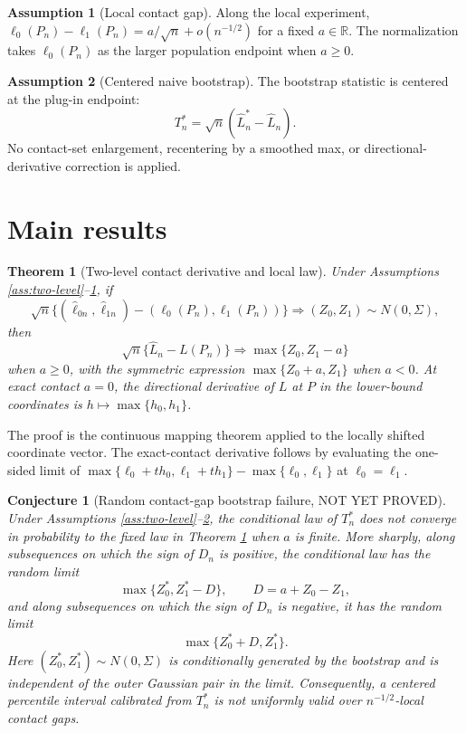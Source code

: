 \documentclass[11pt]{article}
\newcommand{\R}{\mathbb{R}}
\theoremstyle{definition}
\newtheorem{assumption}{Assumption}
\theoremstyle{plain}
\newtheorem{theorem}{Theorem}
\newtheorem{conjecture}{Conjecture}
\theoremstyle{remark}
\begin{document}
\begin{assumption}[Local contact gap]\label{ass:local-gap}
Along the local experiment, \(\ell_0(P_n)-\ell_1(P_n)=a/\sqrt n+o(n^{-1/2})\) for a fixed \(a\in\R\). The normalization takes \(\ell_0(P_n)\) as the larger population endpoint when \(a\ge 0\).
\end{assumption}

\begin{assumption}[Centered naive bootstrap]\label{ass:naive-bootstrap}
The bootstrap statistic is centered at the plug-in endpoint:
\[
T_n^\ast=\sqrt n(\widehat L_n^\ast-\widehat L_n).
\]
No contact-set enlargement, recentering by a smoothed max, or directional-derivative correction is applied.
\end{assumption}

\section{Main results}
\begin{theorem}[Two-level contact derivative and local law]\label{thm:contact-derivative}
Under Assumptions \ref{ass:two-level}--\ref{ass:local-gap}, if
\[
\sqrt n\{(\widehat\ell_{0n},\widehat\ell_{1n})-(\ell_0(P_n),\ell_1(P_n))\}\Rightarrow (Z_0,Z_1)\sim N(0,\Sigma),
\]
then
\[
\sqrt n\{\widehat L_n-L(P_n)\}\Rightarrow \max\{Z_0,Z_1-a\}
\]
when \(a\ge 0\), with the symmetric expression \(\max\{Z_0+a,Z_1\}\) when \(a<0\). At exact contact \(a=0\), the directional derivative of \(L\) at \(P\) in the lower-bound coordinates is \(h\mapsto\max\{h_0,h_1\}\).
\end{theorem}

The proof is the continuous mapping theorem applied to the locally shifted coordinate vector. The exact-contact derivative follows by evaluating the one-sided limit of \(\max\{\ell_0+th_0,\ell_1+th_1\}-\max\{\ell_0,\ell_1\}\) at \(\ell_0=\ell_1\).

\begin{conjecture}[Random contact-gap bootstrap failure, NOT YET PROVED]\label{conj:bootstrap-failure}
Under Assumptions \ref{ass:two-level}--\ref{ass:naive-bootstrap}, the conditional law of \(T_n^\ast\) does not converge in probability to the fixed law in Theorem \ref{thm:contact-derivative} when \(a\) is finite. More sharply, along subsequences on which the sign of \(D_n\) is positive, the conditional law has the random limit
\[
\max\{Z_0^\ast,Z_1^\ast-D\},\qquad D=a+Z_0-Z_1,
\]
and along subsequences on which the sign of \(D_n\) is negative, it has the random limit
\[
\max\{Z_0^\ast+D,Z_1^\ast\}.
\]
Here \((Z_0^\ast,Z_1^\ast)\sim N(0,\Sigma)\) is conditionally generated by the bootstrap and is independent of the outer Gaussian pair in the limit. Consequently, a centered percentile interval calibrated from \(T_n^\ast\) is not uniformly valid over \(n^{-1/2}\)-local contact gaps.
\end{conjecture}
\end{document}
